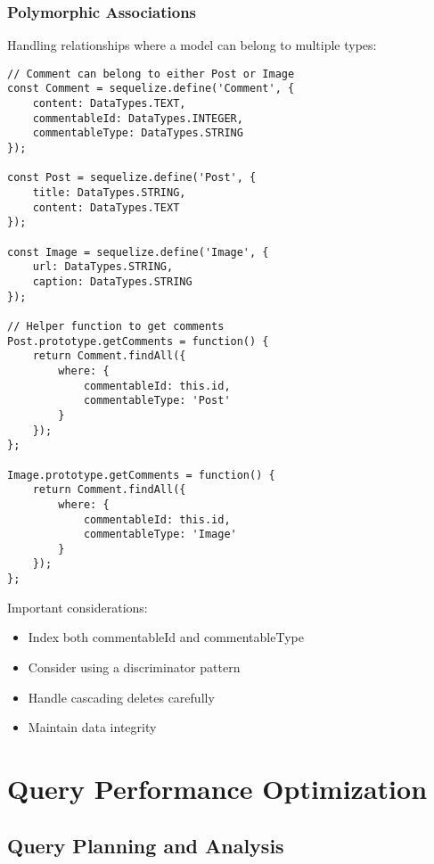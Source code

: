 \documentclass[12pt,a4paper]{book}
\begin{document}
	\subsubsection{Polymorphic Associations}
	\begin{tcolorbox}[title=Implementing Polymorphic Associations]
		Handling relationships where a model can belong to multiple types:
		
		\begin{verbatim}
// Comment can belong to either Post or Image
const Comment = sequelize.define('Comment', {
	content: DataTypes.TEXT,
	commentableId: DataTypes.INTEGER,
	commentableType: DataTypes.STRING
});

const Post = sequelize.define('Post', {
	title: DataTypes.STRING,
	content: DataTypes.TEXT
});

const Image = sequelize.define('Image', {
	url: DataTypes.STRING,
	caption: DataTypes.STRING
});

// Helper function to get comments
Post.prototype.getComments = function() {
	return Comment.findAll({
		where: {
			commentableId: this.id,
			commentableType: 'Post'
		}
	});
};

Image.prototype.getComments = function() {
	return Comment.findAll({
		where: {
			commentableId: this.id,
			commentableType: 'Image'
		}
	});
};
		\end{verbatim}
		
		Important considerations:
		\begin{itemize}
			\item Index both commentableId and commentableType
			\item Consider using a discriminator pattern
			\item Handle cascading deletes carefully
			\item Maintain data integrity
		\end{itemize}
	\end{tcolorbox}
	
	\section{Query Performance Optimization}
	
	\subsection{Query Planning and Analysis}
	
\end{document}
